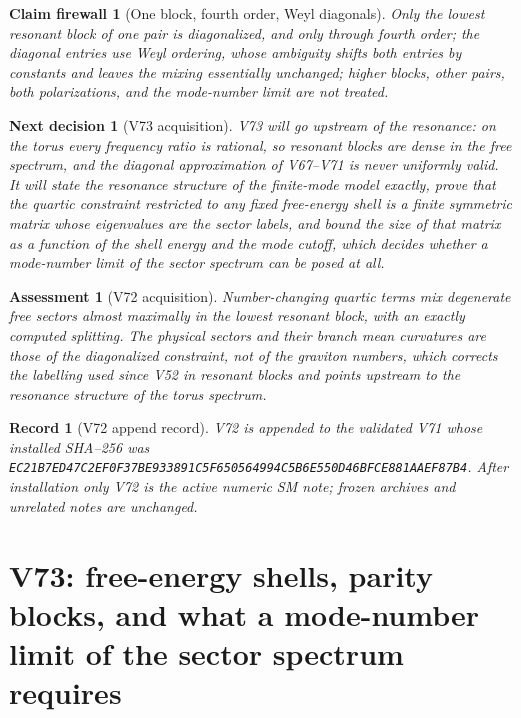 \documentclass[11pt]{article}
\newtheorem{firewall}[theorem]{Claim firewall}
\newtheorem{decision}[theorem]{Next decision}
\newtheorem{assessment}[theorem]{Assessment}
\newtheorem{record}[theorem]{Record}
\theoremstyle{remark}
\begin{document}
\begin{firewall}[One block, fourth order, Weyl diagonals]
\label{fire:v19v72}
Only the lowest resonant block of one pair is diagonalized, and only
through fourth order; the diagonal entries use Weyl ordering, whose
ambiguity shifts both entries by constants and leaves the mixing
essentially unchanged; higher blocks, other pairs, both polarizations,
and the mode-number limit are not treated.
\end{firewall}

\begin{decision}[V73 acquisition]
\label{dec:v19v72-next}
V73 will go upstream of the resonance: on the torus every frequency
ratio is rational, so resonant blocks are dense in the free spectrum,
and the diagonal approximation of V67--V71 is never uniformly valid.
It will state the resonance structure of the finite-mode model exactly,
prove that the quartic constraint restricted to any fixed free-energy
shell is a finite symmetric matrix whose eigenvalues are the sector
labels, and bound the size of that matrix as a function of the shell
energy and the mode cutoff, which decides whether a mode-number limit of
the sector spectrum can be posed at all.
\end{decision}

\begin{assessment}[V72 acquisition]
\label{ass:v19v72}
Number-changing quartic terms mix degenerate free sectors almost
maximally in the lowest resonant block, with an exactly computed
splitting.  The physical sectors and their branch mean curvatures are
those of the diagonalized constraint, not of the graviton numbers,
which corrects the labelling used since V52 in resonant blocks and
points upstream to the resonance structure of the torus spectrum.
\end{assessment}

\begin{record}[V72 append record]
\label{rec:v19v72}
V72 is appended to the validated V71 whose installed SHA--256 was
\texttt{EC21B7ED47C2EF0F37BE933891C5F650564994C5B6E550D46BFCE881AAEF87B4}.
After installation only V72 is the active numeric SM note; frozen
archives and unrelated notes are unchanged.
\end{record}


\section{V73: free-energy shells, parity blocks, and what a mode-number limit of the sector spectrum requires}
\label{sec:v19v73}
\end{document}
